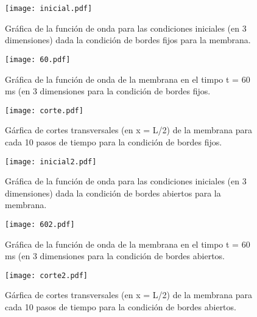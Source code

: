 \documentclass[11pt,letterpaper]{exam}
\begin{document}
\begin{figure}[h]
\begin{center}
\texttt{[image: inicial.pdf]}
\caption{\label{fig:typical}Gr\'afica de la funci\'on de onda para las condiciones iniciales (en 3 dimensiones) dada la condici\'on de bordes fijos para la membrana.}
\end{center}
\end{figure}


\begin{figure}[h]
\begin{center}
\texttt{[image: 60.pdf]}
\caption{\label{fig:typical}Gr\'afica de la funci\'on de onda de la membrana en el timpo t = 60 ms (en 3 dimensiones  para la condici\'on de bordes fijos.}
\end{center}
\end{figure}


\begin{figure}[h]
\begin{center}
\texttt{[image: corte.pdf]}
\caption{\label{fig:typical}G\'arfica de cortes transversales (en x = L/2) de la membrana para cada 10 pasos de tiempo para la condici\'on de bordes fijos.}
\end{center}
\end{figure}






\begin{figure}[h]
\begin{center}
\texttt{[image: inicial2.pdf]}
\caption{\label{fig:typical}Gr\'afica de la funci\'on de onda para las condiciones iniciales (en 3 dimensiones) dada la condici\'on de bordes abiertos para la membrana.}
\end{center}
\end{figure}


\begin{figure}[h]
\begin{center}
\texttt{[image: 602.pdf]}
\caption{\label{fig:typical}Gr\'afica de la funci\'on de onda de la membrana en el timpo t = 60 ms (en 3 dimensiones  para la condici\'on de bordes abiertos.}
\end{center}
\end{figure}


\begin{figure}[h]
\begin{center}
\texttt{[image: corte2.pdf]}
\caption{\label{fig:typical}G\'arfica de cortes transversales (en x = L/2) de la membrana para cada 10 pasos de tiempo para la condici\'on de bordes abiertos.}
\end{center}
\end{figure}
\end{document}
